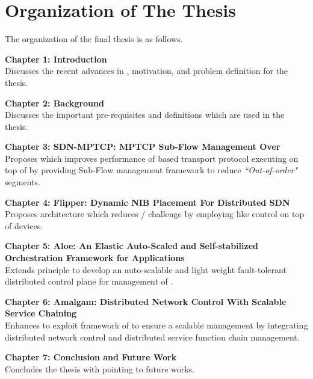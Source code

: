 \documentclass[twoside,fancyhdr]{18_format/csethesis}
\begin{document}
\section{Organization of The Thesis}
  \acresetall
The organization of the final thesis is as follows.
\begin{description}
\item \textbf{Chapter 1: Introduction}\\
	Discusses the recent advances in , motivation, and problem definition for the thesis.
\item \textbf{Chapter 2: Background}\\
	Discusses the important pre-requisites and definitions which are used in the thesis.
\item \textbf{Chapter 3: SDN-MPTCP: MPTCP Sub-Flow Management Over }\\
	Proposes  which improves performance of  based transport protocol executing on top of  by providing Sub-Flow management framework to reduce \emph{``Out-of-order"} segments.
\item \textbf{Chapter 4: Flipper: Dynamic NIB Placement For Distributed SDN}\\
	Proposes  architecture which reduces / challenge by employing  like control on top of  devices.
\item \textbf{Chapter 5: Aloe: An Elastic Auto-Scaled and Self-stabilized Orchestration Framework for  Applications}\\
	Extends  principle to develop an auto-scalable and light weight fault-tolerant distributed control plane for management of .
\item \textbf{Chapter 6: Amalgam: Distributed Network Control With Scalable Service Chaining}\\
	Enhances  to exploit  framework of  to ensure a scalable  management by integrating distributed network control and distributed service function chain management.
\item \textbf{Chapter 7: Conclusion and Future Work}\\
	Concludes the thesis with pointing to future works.
\end{description}
%
\end{document}
